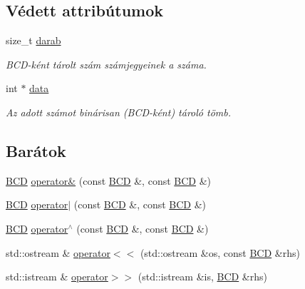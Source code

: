 \subsection*{Védett attribútumok}
\begin{DoxyCompactItemize}
\item 
size\+\_\+t \hyperlink{class_b_c_d_a16422fa6a3f031ad2243c4827ece3055}{darab}\hypertarget{class_b_c_d_a16422fa6a3f031ad2243c4827ece3055}{}\label{class_b_c_d_a16422fa6a3f031ad2243c4827ece3055}

\begin{DoxyCompactList}\small\item\em B\+C\+D-\/ként tárolt szám számjegyeinek a száma. \end{DoxyCompactList}\item 
int $\ast$ \hyperlink{class_b_c_d_a58a8646f5f9c9244cf1038f7f614a367}{data}\hypertarget{class_b_c_d_a58a8646f5f9c9244cf1038f7f614a367}{}\label{class_b_c_d_a58a8646f5f9c9244cf1038f7f614a367}

\begin{DoxyCompactList}\small\item\em Az adott számot binárisan (B\+C\+D-\/ként) tároló tömb. \end{DoxyCompactList}\end{DoxyCompactItemize}
\subsection*{Barátok}
\begin{DoxyCompactItemize}
\item 
\hyperlink{class_b_c_d}{B\+CD} \hyperlink{class_b_c_d_a42786a30872d8309bec099697da49c3f}{operator\&} (const \hyperlink{class_b_c_d}{B\+CD} \&, const \hyperlink{class_b_c_d}{B\+CD} \&)
\item 
\hyperlink{class_b_c_d}{B\+CD} \hyperlink{class_b_c_d_aba082bc0459d5d849d0ad4945ff4e9c3}{operator$\vert$} (const \hyperlink{class_b_c_d}{B\+CD} \&, const \hyperlink{class_b_c_d}{B\+CD} \&)
\item 
\hyperlink{class_b_c_d}{B\+CD} \hyperlink{class_b_c_d_a7fdd9c16852182287ab643c8f0b84be5}{operator$^\wedge$} (const \hyperlink{class_b_c_d}{B\+CD} \&, const \hyperlink{class_b_c_d}{B\+CD} \&)
\item 
std\+::ostream \& \hyperlink{class_b_c_d_a27ee16cc7fdea5f5179e879c9b19b5c0}{operator$<$$<$} (std\+::ostream \&os, const \hyperlink{class_b_c_d}{B\+CD} \&rhs)
\item 
std\+::istream \& \hyperlink{class_b_c_d_a997c3f7cd99c52b5a35bdcb5b50f4171}{operator$>$$>$} (std\+::istream \&is, \hyperlink{class_b_c_d}{B\+CD} \&rhs)
\end{DoxyCompactItemize}


